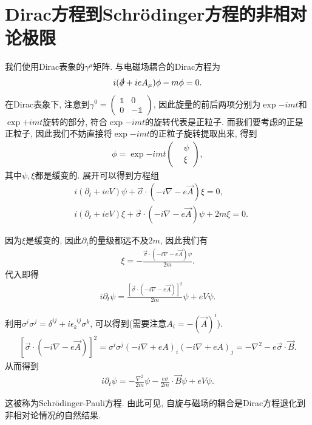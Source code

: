 \section{Dirac方程到Schr\"odinger方程的非相对论极限}\label{dirac-to-schrodinger}
我们使用Dirac表象的$\gamma^\mu$矩阵. 与电磁场耦合的Dirac方程为
\begin{align}
    i(\slashed\partial+ieA_\mu)\phi-m\phi=0.
\end{align}
在Dirac表象下, 注意到$\gamma^0=\begin{pmatrix}
    \mathds1 & 0\\
    0 & -\mathds1
\end{pmatrix}$, 因此旋量的前后两项分别为$\exp{-imt}$和$\exp{+imt}$旋转的部分, 符合$\exp{-imt}$的旋转代表是正粒子. 而我们要考虑的正是正粒子, 因此我们不妨直接将$\exp{-imt}$的正粒子旋转提取出来, 得到
\begin{align}
    \phi=\exp{-imt}\begin{pmatrix}
        & \psi \\
        & \xi
    \end{pmatrix},
\end{align}
其中$\psi, \xi$都是缓变的. 展开可以得到方程组
\begin{align}
    & i(\partial_t+ieV)\psi+\vec\sigma\cdot(-i\nabla-e\vec A)\xi=0,\\
    & i(\partial_t+ieV)\xi+\vec\sigma\cdot(-i\nabla-e\vec A)\psi+2m\xi=0.
\end{align}

因为$\xi$是缓变的, 因此$\partial_t$的量级都远不及$2m$, 因此我们有
\begin{align}
    \xi=-\frac{\vec\sigma\cdot(-i\nabla-e\vec A)\psi}{2m}.
\end{align}
代入即得
\begin{align}
    i\partial_t\psi=\frac{\left[\vec\sigma\cdot(-i\nabla-e\vec A)\right]^2}{2m}\psi+eV\psi.
\end{align}

利用$\sigma^i\sigma^j=\delta^{ij}+i\epsilon_{k}^{~~ij}\sigma^k$, 可以得到(需要注意$A_i=-(\vec A)^i$).
\begin{align}
    \left[\vec\sigma\cdot(-i\nabla-e\vec A)\right]^2=\sigma^i\sigma^j(-i\nabla+eA)_i(-i\nabla+eA)_j=-\nabla^2-e\vec\sigma\cdot\vec B.
\end{align}
从而得到
\begin{align}
    i\partial_t\psi=-\frac{\nabla^2}{2m}\psi-\frac{e\sigma}{2m}\cdot\vec B\psi+eV\psi.
\end{align}

这被称为Schr\"odinger-Pauli方程. 由此可见, 自旋与磁场的耦合是Dirac方程退化到非相对论情况的自然结果.